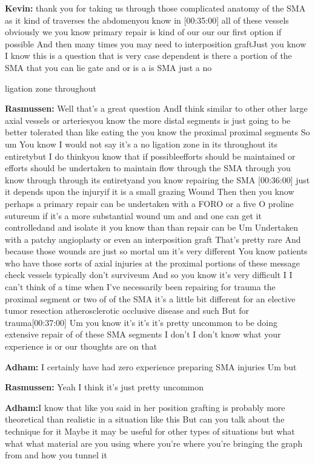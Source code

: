\documentclass[
]{book}
\begin{document}
\textbf{Kevin:} thank you for taking us through those complicated anatomy of
the SMA as it kind of traverses the abdomenyou know in {[}00:35:00{]} all of
these vessels obviously we you know primary repair is kind of our our
our first option if possible And then many times you may need to
interposition graftJust you know I know this is a question that is very
case dependent is there a portion of the SMA that you can lie gate and
or is a is SMA just a no

ligation zone throughout

\textbf{Rasmussen:} Well that's a great question AndI think similar to other
other large axial vessels or arteriesyou know the more distal segments
is just going to be better tolerated than like eating the you know the
proximal proximal segments So um You know I would not say it's a no
ligation zone in its throughout its entiretybut I do thinkyou know that
if possibleefforts should be maintained or efforts should be undertaken
to maintain flow through the SMA through you know through through its
entiretyand you know repairing the SMA {[}00:36:00{]} just it depends upon
the injuryif it is a small grazing Wound Then then you know perhaps a
primary repair can be undertaken with a FORO or a five O proline
sutureum if it's a more substantial wound um and and one can get it
controlledand and isolate it you know than than repair can be Um
Undertaken with a patchy angioplasty or even an interposition graft
That's pretty rare And because those wounds are just so mortal um it's
very different You know patients who have those sorts of axial injuries
at the proximal portions of these message check vessels typically don't
surviveum And so you know it's very difficult I I can't think of a time
when I've necessarily been repairing for trauma the proximal segment or
two of of the SMA it's a little bit different for an elective tumor
resection atherosclerotic occlusive disease and such But for
trauma{[}00:37:00{]} Um you know it's it's it's pretty uncommon to be doing
extensive repair of of these SMA segments I don't I don't know what your
experience is or our thoughts are on that

\textbf{Adham:} I certainly have had zero experience preparing SMA injuries
Um but

\textbf{Rasmussen:} Yeah I think it's just pretty uncommon

\textbf{Adham:}I know that like you said in her position grafting is probably
more theoretical than realistic in a situation like this But can you
talk about the technique for it Maybe it may be useful for other types
of situations but what what what material are you using where you're
where you're bringing the graph from and how you tunnel it
\end{document}
